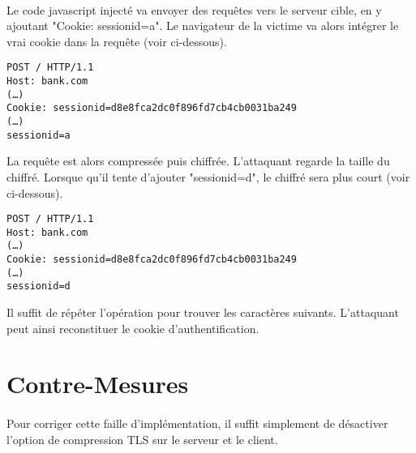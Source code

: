 \paragraph{}
Le code javascript injecté va envoyer des requêtes vers le serveur cible, en y ajoutant "Cookie: sessionid=a". Le navigateur de la victime va alors intégrer le vrai cookie dans la requête (voir ci-dessous).


\begin{verbatim}
POST / HTTP/1.1
Host: bank.com
(…)
Cookie: sessionid=d8e8fca2dc0f896fd7cb4cb0031ba249
(…)
sessionid=a
\end{verbatim}


La requête est alors compressée puis chiffrée. L'attaquant regarde la taille du chiffré.
Lorsque qu'il tente d'ajouter "sessionid=d", le chiffré sera plus court (voir ci-dessous). 


\begin{verbatim}
POST / HTTP/1.1
Host: bank.com
(…)
Cookie: sessionid=d8e8fca2dc0f896fd7cb4cb0031ba249
(…)
sessionid=d
\end{verbatim}

Il suffit de répéter l'opération pour trouver les caractères suivants. L'attaquant peut ainsi reconstituer le cookie d'authentification.

\section{Contre-Mesures}
\paragraph{}
Pour corriger cette faille d'implémentation, il suffit simplement de désactiver l'option de compression TLS sur le serveur et le client.
